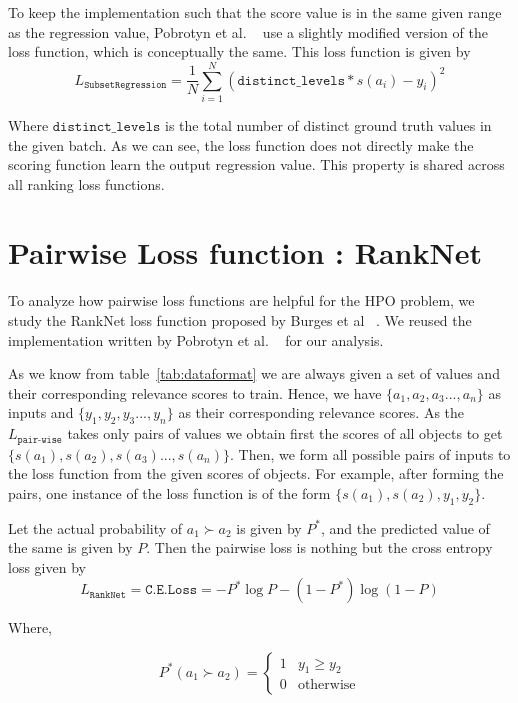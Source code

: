 \documentclass[12pt, twoside, ngerman]{report}
\begin{document}
To keep the implementation such that the score value is in the same given range as the regression value,  Pobrotyn et al. ~\cite{Pobrotyn2020ContextAwareLT} use a slightly modified version of the loss function, which is conceptually the same.
This loss function is given by
\begin{equation}
L_{\texttt{SubsetRegression}} = \frac{1}{N} \sum\limits_{i=1}^{N} (\texttt{distinct\_levels} * s(a_i) - y_i)^2
\end{equation}

Where $\texttt{distinct\_levels}$ is the total number of distinct ground truth values in the given batch.
As we can see, the loss function does not directly make the scoring
function learn the output regression value.
This property is shared across all ranking loss functions.

\section{Pairwise Loss function : RankNet}

To analyze how pairwise loss functions are helpful for the HPO problem,
we study the RankNet loss function proposed by Burges
 et al ~\cite{ranknetpaper}.
We reused the implementation written by Pobrotyn et al. ~\cite{Pobrotyn2020ContextAwareLT} for our analysis.

As we know from table~\ref{tab:dataformat} we are always given a set of values and their corresponding relevance scores to train.
Hence, we have $\{a_1, a_2, a_3..., a_n\}$ as inputs and $\{y_1, y_2, y_3..., y_n\}$ as their corresponding relevance scores.
As the $L_{\texttt{pair-wise}}$ takes only pairs of values we obtain first the scores of all objects to get $\{s(a_1), s(a_2), s(a_3)..., s(a_n)\}$.
Then,  we form all possible pairs of inputs to the loss function from the given scores of objects.
For example,  after forming the pairs, one instance of the loss function is of the form $\{s(a_1), s(a_2), y_1, y_2\}$.

Let the actual probability of $a_1 \succ a_2$ is given by $P^*$,  and the predicted value of the same is given by $P$.
Then the pairwise loss is nothing but the cross entropy loss given by
\begin{equation}
L_{\texttt{RankNet}} = \texttt{C.E.Loss} = -P^*\log P - (1 - P^*)\log(1-P)
\end{equation}

Where,

\begin{equation}
  P^*(a_1 \succ a_2) =
    \begin{cases}
      1 & y_1 \geq y_2 \\
      0 & \text{otherwise}
    \end{cases}       
\end{equation}
\end{document}
